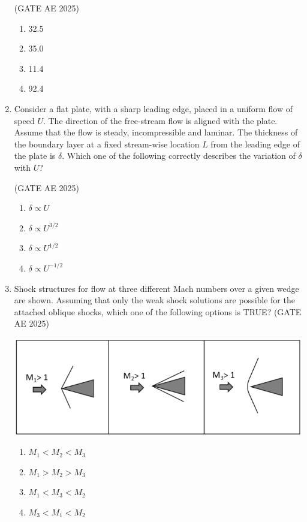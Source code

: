 \documentclass[journal,12pt,onecolumn]{IEEEtran}
\theoremstyle{remark}
\begin{document}
\begin{flushleft}
\begin{enumerate}
\hfill (GATE AE 2025)

\begin{enumerate}
    \item 32.5
    \item 35.0
    \item 11.4
    \item 92.4
\end{enumerate}

\item  Consider a flat plate, with a sharp leading edge, placed in a uniform flow of speed $U$. The direction of the free-stream flow is aligned with the plate. Assume that the flow is steady, incompressible and laminar. The thickness of the boundary layer at a fixed stream-wise location $L$ from the leading edge of the plate is $\delta$. Which one of the following correctly describes the variation of $\delta$ with $U$?  

\hfill (GATE AE 2025)

\begin{enumerate}
\item $\delta \propto U$  
\item $\delta \propto U^{3/2}$  
\item $\delta \propto U^{1/2}$  
\item $\delta \propto U^{-1/2}$ 
\end{enumerate} 


\item Shock structures for flow at three different Mach numbers over a given wedge are shown. Assuming that only the weak shock solutions are possible for the attached oblique shocks, which one of the following options is TRUE?  
\hfill (GATE AE 2025)

\begin{center}
\includegraphics[width=0.5\columnwidth]{figs/43.png}
\end{center}

\begin{enumerate}
\item $M_1 < M_2 < M_3$  
\item $M_1 > M_2 > M_3$  
\item $M_1 < M_3 < M_2$  
\item $M_3 < M_1 < M_2$  
\end{enumerate}


\end{enumerate}
\end{flushleft}
\end{document}
